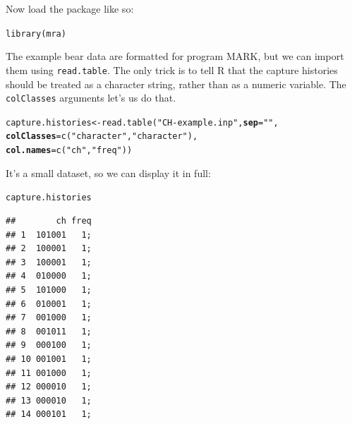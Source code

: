 \documentclass[12pt]{article}\usepackage[]{graphicx}\usepackage[]{xcolor}
\makeatletter
\newcommand{\hlstr}[1]{\textcolor[rgb]{0.749,0.012,0.012}{#1}}%
\newcommand{\hlstd}[1]{\textcolor[rgb]{0,0,0}{#1}}%
\newcommand{\hlkwb}[1]{\textcolor[rgb]{0,0.341,0.682}{#1}}%
\newcommand{\hlkwc}[1]{\textcolor[rgb]{0,0,0}{\textbf{#1}}}%
\newcommand{\hlkwd}[1]{\textcolor[rgb]{0.004,0.004,0.506}{#1}}%
\newenvironment{kframe}{%
 \def\at@end@of@kframe{}%
 \ifinner\ifhmode%
  \def\at@end@of@kframe{\end{minipage}}%
  \begin{minipage}{\columnwidth}%
 \fi\fi%
 \def\FrameCommand##1{\hskip\@totalleftmargin \hskip-\fboxsep
 \colorbox{shadecolor}{##1}\hskip-\fboxsep
     \hskip-\linewidth \hskip-\@totalleftmargin \hskip\columnwidth}%
 \MakeFramed {\advance\hsize-\width
   \@totalleftmargin\z@ \linewidth\hsize
   \@setminipage}}%
 {\par\unskip\endMakeFramed%
 \at@end@of@kframe}
\newenvironment{knitrout}{}{} %
\newcommand{\inr}[1]{\colorbox{inlinecolor}{\texttt{#1}}}
\makeatother
\begin{document}
Now load the package like so: 

\begin{knitrout}
\color{fgcolor}\begin{kframe}
\begin{alltt}
\hlkwd{library}\hlstd{(mra)}
\end{alltt}


{\ttfamily\noindent\itshape\color{messagecolor}{\#\# mra (version 2.16.11)}}\end{kframe}
\end{knitrout}

The example bear data are formatted for program MARK, but we can
import them using  \inr{read.table}. The only trick is to tell R that
the capture histories should be treated as a character string, rather
than as a numeric variable. The \inr{colClasses} arguments let's us do
that. 

\begin{knitrout}
\color{fgcolor}\begin{kframe}
\begin{alltt}
\hlstd{capture.histories} \hlkwb{<-} \hlkwd{read.table}\hlstd{(}\hlstr{"CH-example.inp"}\hlstd{,} \hlkwc{sep}\hlstd{=}\hlstr{" "}\hlstd{,}
                                \hlkwc{colClasses}\hlstd{=}\hlkwd{c}\hlstd{(}\hlstr{"character"}\hlstd{,} \hlstr{"character"}\hlstd{),}
                                \hlkwc{col.names}\hlstd{=}\hlkwd{c}\hlstd{(}\hlstr{"ch"}\hlstd{,} \hlstr{"freq"}\hlstd{))}
\end{alltt}
\end{kframe}
\end{knitrout}



It's a small dataset, so we can display it in full:

\begin{knitrout}
\color{fgcolor}\begin{kframe}
\begin{alltt}
\hlstd{capture.histories}
\end{alltt}
\begin{verbatim}
##        ch freq
## 1  101001   1;
## 2  100001   1;
## 3  100001   1;
## 4  010000   1;
## 5  101000   1;
## 6  010001   1;
## 7  001000   1;
## 8  001011   1;
## 9  000100   1;
## 10 001001   1;
## 11 001000   1;
## 12 000010   1;
## 13 000010   1;
## 14 000101   1;
\end{verbatim}
\end{kframe}
\end{knitrout}
\end{document}
